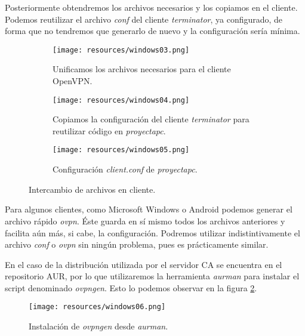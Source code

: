 \documentclass[a4paper, 11pt, titlepage]{article}
\begin{document}
        Posteriormente obtendremos los archivos necesarios y los copiamos en el cliente. Podemos
        reutilizar el archivo \textit{conf} del cliente \textit{terminator}, ya configurado, de forma
        que no tendremos que generarlo de nuevo y la configuración sería mínima.

        \begin{figure}[htp]
        \centering
            \begin{subfigure}[b]{1\linewidth}
            \texttt{[image: resources/windows03.png]}
            \caption{Unificamos los archivos necesarios para el cliente OpenVPN.}
            \end{subfigure}

            \begin{subfigure}[b]{0.8\linewidth}
            \texttt{[image: resources/windows04.png]}
            \caption{Copiamos la configuración del cliente \textit{terminator} para reutilizar
            código en \textit{proyectapc}.}
            \end{subfigure}

            \begin{subfigure}[b]{0.7\linewidth}
            \texttt{[image: resources/windows05.png]}
            \caption{Configuración \textit{client.conf} de \textit{proyectapc}.}
            \end{subfigure}
        \caption{Intercambio de archivos en cliente.}
        \label{fig:windows0305}
        \end{figure}

        Para algunos clientes, como Microsoft Windows o Android podemos generar el archivo rápido
        \textit{ovpn}. Éste guarda en sí mismo todos los archivos anteriores y facilita aún más, si 
        cabe, la configuración. Podremos utilizar indistintivamente el archivo \textit{conf} o 
        \textit{ovpn} sin ningún problema, pues es prácticamente similar.

        En el caso de la distribución utilizada por el servidor CA se encuentra en el repositorio 
        AUR, por lo que utilizaremos la herramienta \textit{aurman} para instalar el script 
        denominado \textit{ovpngen}. Esto lo podemos observar en la figura \ref{fig:windows06}.

        \begin{figure}[htp]
            \centering
            \texttt{[image: resources/windows06.png]}
            \caption{Instalación de \textit{ovpngen} desde \textit{aurman}.}
            \label{fig:windows06}
        \end{figure}  
\end{document}
